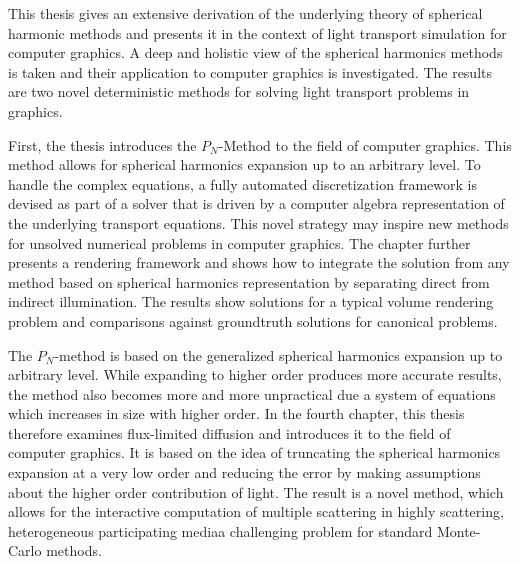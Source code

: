 This thesis gives an extensive derivation of the underlying theory of spherical harmonic methods and presents it in the context of light transport simulation for computer graphics. A deep and holistic view of the spherical harmonics methods is taken and their application to computer graphics is investigated. The results are two novel deterministic methods for solving light transport problems in graphics.

First, the thesis introduces the $P_N$-Method to the field of computer graphics. This method allows for spherical harmonics expansion up to an arbitrary level. To handle the complex equations, a fully automated discretization framework is devised as part of a solver that is driven by a computer algebra representation of the underlying transport equations. This novel strategy may inspire new methods for unsolved numerical problems in computer graphics. The chapter further presents a rendering framework and shows how to integrate the solution from any method based on spherical harmonics representation by separating direct from indirect illumination. The results show solutions for a typical volume rendering problem and comparisons against groundtruth solutions for canonical problems.

The $P_N$-method is based on the generalized spherical harmonics expansion up to arbitrary level. While expanding to higher order produces more accurate results, the method also becomes more and more unpractical due a system of equations which increases in size with higher order. In the fourth chapter, this thesis therefore examines flux-limited diffusion and introduces it to the field of computer graphics. It is based on the idea of truncating the spherical harmonics expansion at a very low order and reducing the error by making assumptions about the higher order contribution of light. The result is a novel method, which allows for the interactive computation of multiple scattering in highly scattering, heterogeneous participating media\mydash a challenging problem for standard Monte-Carlo methods.